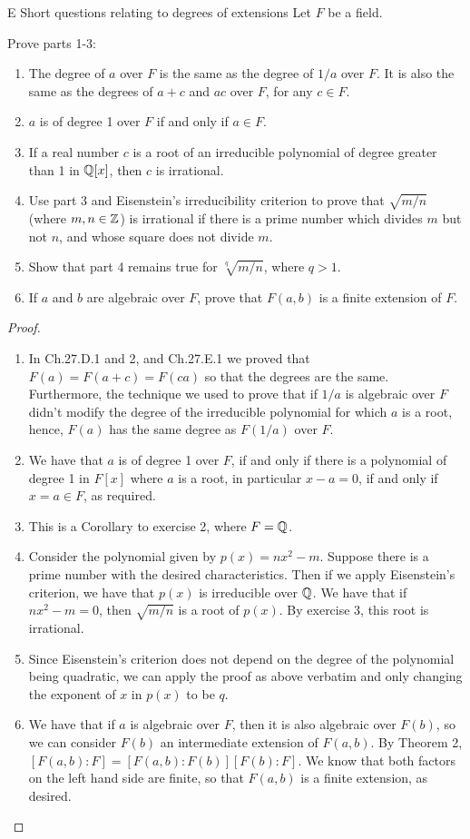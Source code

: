 \begin{exercise}{E Short questions relating to degrees of extensions}
Let $F$ be a field.

Prove parts 1-3:
\begin{enumerate}
    \item The degree of $a$ over $F$ is the same as the degree of $1/a$ over $F$. It is also the same as the degrees of $a+c$ and $ac$ over $F$, for any $c\in F$.
    \item $a$ is of degree 1 over $F$ if and only if $a\in F$.
    \item If a real number $c$ is a root of an irreducible polynomial of degree greater than 1 in $\mathbb{Q}[x]$, then $c$ is irrational.
    \item Use part 3 and Eisenstein's irreducibility criterion to prove that $\sqrt{m/n}$ (where $m,n\in\mathbb{Z}$) is irrational if there is a prime number which divides $m$ but not $n$, and whose square does not divide $m$.
    \item Show that part 4 remains true for $\sqrt[q]{m/n}$, where $q>1$.
    \item If $a$ and $b$ are algebraic over $F$, prove that $F(a,b)$ is a finite extension of $F$.
\end{enumerate}
\end{exercise}
\begin{proof}
 \begin{enumerate}
     \item In Ch.27.D.1 and 2, and Ch.27.E.1 we proved that $F(a)=F(a+c)=F(ca)$ so that the degrees are the same. Furthermore, the technique we used to prove that if $1/a$ is algebraic over $F$ didn't modify the degree of the irreducible polynomial for which $a$ is a root, hence, $F(a)$ has the same degree as $F(1/a)$ over $F$.
     \item We have that $a$ is of degree 1 over $F$, if and only if there is a polynomial of degree 1 in $F[x]$ where $a$ is a root, in particular $x-a=0$, if and only if $x=a\in F$, as required.
     \item This is a Corollary to exercise 2, where $F=\mathbb{Q}$.
     \item Consider the polynomial given by $p(x)=nx^2-m$. Suppose there is a prime number with the desired characteristics. Then if we apply Eisenstein's criterion, we have that $p(x)$ is irreducible over $\mathbb{Q}$. We have that if $nx^2-m=0$, then $\sqrt{m/n}$ is a root of $p(x)$. By exercise 3, this root is irrational.
    \item Since Eisenstein's criterion does not depend on the degree of the polynomial being quadratic, we can apply the proof as above verbatim and only changing the exponent of $x$ in $p(x)$ to be $q$.
    \item We have that if $a$ is algebraic over $F$, then it is also algebraic over $F(b)$, so we can consider $F(b)$ an intermediate extension of $F(a,b)$. By Theorem 2, $[F(a,b):F]=[F(a,b):F(b)][F(b):F]$. We know that both factors on the left hand side are finite, so that $F(a,b)$ is a finite extension, as desired.
 \end{enumerate}
\end{proof}

